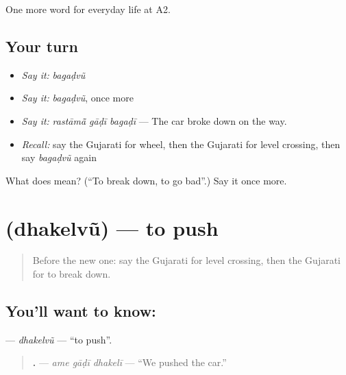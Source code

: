 \begin{grammarlens}[title={What you've built}]
One more word for everyday life at A2.
\end{grammarlens}

\subsection*{Your turn}
\begin{itemize}
\raggedright
  \item \emph{Say it:} \emph{bagaḍvũ}
  \item \emph{Say it:} \emph{bagaḍvũ}, once more
  \item \emph{Say it:} \emph{rastāmā̃ gāḍī bagaḍī} — The car broke down on the way.
  \item \emph{Recall:} say the Gujarati for wheel, then the Gujarati for level crossing, then say \emph{bagaḍvũ} again
\end{itemize}

\begin{tcolorbox}[breakable,colback=teal!4,colframe=teal!35!black,title={Before you move on}]
What does  mean? (\textquotedblleft{}To break down, to go bad\textquotedblright{}.) Say it once more.
\end{tcolorbox}
\section[\texorpdfstring{\gu{ધકેલવું} (dhakelvũ)}{ધકેલવું (dhakelvũ)}]{ (dhakelvũ) — to push}

\label{lesson:GU-C209-dhakelvu}



\begin{quote}
Before the new one: say the Gujarati for level crossing, then the Gujarati for to break down.
\end{quote}

\subsection*{You'll want to know: }
\textbf{} — \emph{dhakelvũ} — \textquotedblleft{}to push\textquotedblright{}.

\begin{quote}
\textbf{  .} — \emph{ame gāḍī dhakelī} — \textquotedblleft{}We pushed the car.\textquotedblright{}
\end{quote}

